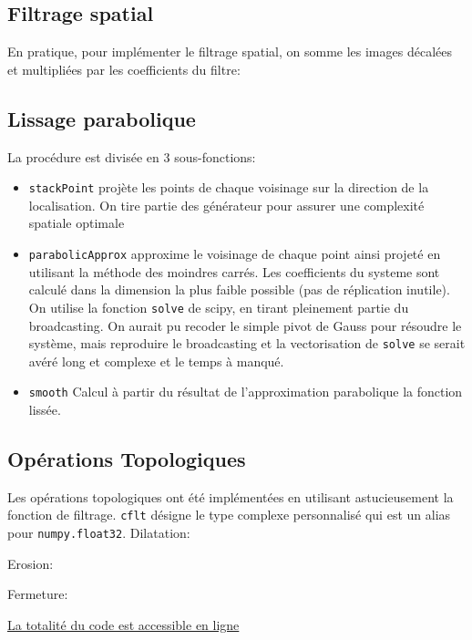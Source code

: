 \documentclass{article}
\begin{document}
\subsection{Filtrage spatial}\label{filt}

En pratique, pour implémenter le filtrage spatial, on somme les images décalées et multipliées par les coefficients du filtre:


\subsection{Lissage parabolique}\label{Parab}

La procédure est divisée en 3 sous-fonctions:
\begin{itemize}
	\item \texttt{stackPoint} projète les points de chaque voisinage sur la direction de la localisation. On tire partie des générateur pour assurer une complexité spatiale optimale
	\item \texttt{parabolicApprox} approxime le voisinage de chaque point ainsi projeté en utilisant la méthode des moindres carrés. Les coefficients du systeme sont calculé dans la dimension la plus faible possible (pas de réplication inutile). On utilise la fonction \texttt{solve} de scipy, en tirant pleinement partie du broadcasting. On aurait pu recoder le simple pivot de Gauss pour résoudre le système, mais reproduire le broadcasting et la vectorisation de \texttt{solve} se serait avéré long et complexe et le temps à manqué.
	\item \texttt{smooth} Calcul à partir du résultat de l'approximation parabolique la fonction lissée.
\end{itemize}




\subsection{Opérations Topologiques}\label{Topo}
Les opérations topologiques ont été implémentées en utilisant astucieusement la fonction de filtrage. \texttt{cflt} désigne le type complexe personnalisé qui est un alias pour \texttt{numpy.float32}.
Dilatation:

Erosion:

Fermeture:


\href{https://github.com/Involture/fuuusion/tree/master/python}{La totalité du code est accessible en ligne}
\end{document}
